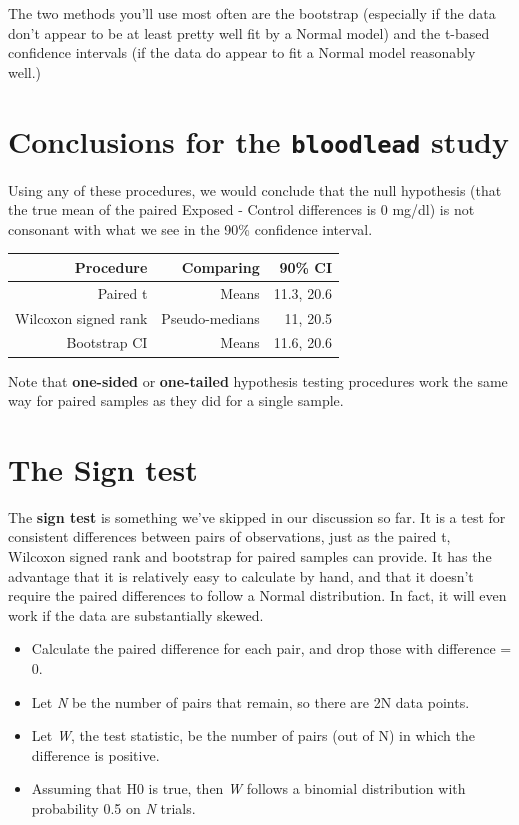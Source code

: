 \documentclass[
]{book}
\providecommand{\tightlist}{%
  \setlength{\itemsep}{0pt}\setlength{\parskip}{0pt}}
\begin{document}
The two methods you'll use most often are the bootstrap (especially if the data don't appear to be at least pretty well fit by a Normal model) and the t-based confidence intervals (if the data do appear to fit a Normal model reasonably well.)

\hypertarget{conclusions-for-the-bloodlead-study}{%
\section{\texorpdfstring{Conclusions for the \texttt{bloodlead} study}{Conclusions for the bloodlead study}}\label{conclusions-for-the-bloodlead-study}}

Using any of these procedures, we would conclude that the null hypothesis (that the true mean of the paired Exposed - Control differences is 0 mg/dl) is not consonant with what we see in the 90\% confidence interval.

\begin{longtable}[]{@{}rrr@{}}
\toprule
Procedure & Comparing & 90\% CI\tabularnewline
\midrule
\endhead
Paired t & Means & 11.3, 20.6\tabularnewline
Wilcoxon signed rank & Pseudo-medians & 11, 20.5\tabularnewline
Bootstrap CI & Means & 11.6, 20.6\tabularnewline
\bottomrule
\end{longtable}

Note that \textbf{one-sided} or \textbf{one-tailed} hypothesis testing procedures work the same way for paired samples as they did for a single sample.

\hypertarget{the-sign-test}{%
\section{The Sign test}\label{the-sign-test}}

The \textbf{sign test} is something we've skipped in our discussion so far. It is a test for consistent differences between pairs of observations, just as the paired t, Wilcoxon signed rank and bootstrap for paired samples can provide. It has the advantage that it is relatively easy to calculate by hand, and that it doesn't require the paired differences to follow a Normal distribution. In fact, it will even work if the data are substantially skewed.

\begin{itemize}
\tightlist
\item
  Calculate the paired difference for each pair, and drop those with difference = 0.
\item
  Let \emph{N} be the number of pairs that remain, so there are 2N data points.
\item
  Let \emph{W}, the test statistic, be the number of pairs (out of N) in which the difference is positive.
\item
  Assuming that H0 is true, then \emph{W} follows a binomial distribution with probability 0.5 on \emph{N} trials.
\end{itemize}
\end{document}

